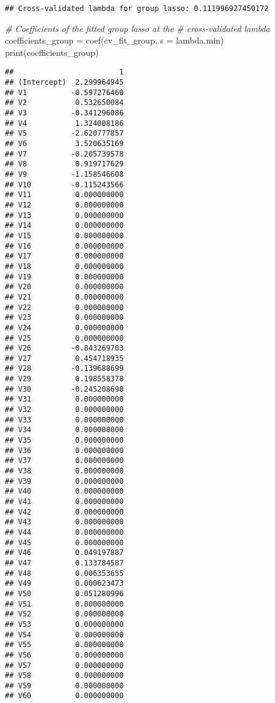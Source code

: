 \documentclass[
]{book}
\newenvironment{Shaded}{\begin{snugshade}}{\end{snugshade}}
\newcommand{\AttributeTok}[1]{\textcolor[rgb]{0.77,0.63,0.00}{#1}}
\newcommand{\CommentTok}[1]{\textcolor[rgb]{0.56,0.35,0.01}{\textit{#1}}}
\newcommand{\FunctionTok}[1]{\textcolor[rgb]{0.00,0.00,0.00}{#1}}
\newcommand{\NormalTok}[1]{#1}
\newcommand{\OtherTok}[1]{\textcolor[rgb]{0.56,0.35,0.01}{#1}}
\newcommand{\StringTok}[1]{\textcolor[rgb]{0.31,0.60,0.02}{#1}}
\begin{document}
\begin{verbatim}
## Cross-validated lambda for group lasso: 0.111996927450172
\end{verbatim}

\begin{Shaded}
\begin{Highlighting}[]
\CommentTok{\# Coefficients of the fitted group lasso at the}
\CommentTok{\# cross{-}validated lambda}
\NormalTok{coefficients\_group }\OtherTok{=} \FunctionTok{coef}\NormalTok{(cv\_fit\_group, }\AttributeTok{s =} \StringTok{\textquotesingle{}lambda.min\textquotesingle{}}\NormalTok{)}
\FunctionTok{print}\NormalTok{(coefficients\_group)}
\end{Highlighting}
\end{Shaded}

\begin{verbatim}
##                        1
## (Intercept)  2.299964945
## V1          -0.597276460
## V2           0.532650084
## V3          -0.341296086
## V4           1.324008186
## V5          -2.620777857
## V6           3.520635169
## V7          -0.205739578
## V8           0.919717629
## V9          -1.158546608
## V10         -0.115243566
## V11          0.000000000
## V12          0.000000000
## V13          0.000000000
## V14          0.000000000
## V15          0.000000000
## V16          0.000000000
## V17          0.000000000
## V18          0.000000000
## V19          0.000000000
## V20          0.000000000
## V21          0.000000000
## V22          0.000000000
## V23          0.000000000
## V24          0.000000000
## V25          0.000000000
## V26         -0.843269703
## V27          0.454718935
## V28         -0.139688699
## V29          0.198558378
## V30         -0.245208698
## V31          0.000000000
## V32          0.000000000
## V33          0.000000000
## V34          0.000000000
## V35          0.000000000
## V36          0.000000000
## V37          0.000000000
## V38          0.000000000
## V39          0.000000000
## V40          0.000000000
## V41          0.000000000
## V42          0.000000000
## V43          0.000000000
## V44          0.000000000
## V45          0.000000000
## V46          0.049197887
## V47          0.133784587
## V48          0.006353655
## V49          0.000623473
## V50          0.051280996
## V51          0.000000000
## V52          0.000000000
## V53          0.000000000
## V54          0.000000000
## V55          0.000000000
## V56          0.000000000
## V57          0.000000000
## V58          0.000000000
## V59          0.000000000
## V60          0.000000000

\end{verbatim}
\end{document}
